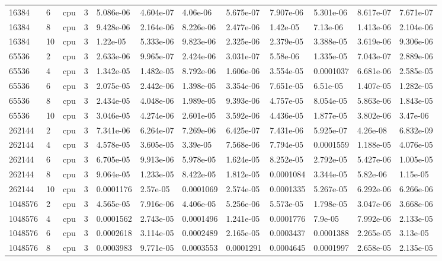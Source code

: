 \begin{tabular}{llllllllllll}
16384 & 6 & cpu & 3 & 5.086e-06 & 4.604e-07 & 4.06e-06 & 5.675e-07 & 7.907e-06 & 5.301e-06 & 8.617e-07 & 7.671e-07 \\
16384 & 8 & cpu & 3 & 9.428e-06 & 2.164e-06 & 8.226e-06 & 2.477e-06 & 1.42e-05 & 7.13e-06 & 1.413e-06 & 2.104e-06 \\
16384 & 10 & cpu & 3 & 1.22e-05 & 5.333e-06 & 9.823e-06 & 2.325e-06 & 2.379e-05 & 3.388e-05 & 3.619e-06 & 9.306e-06 \\
65536 & 2 & cpu & 3 & 2.633e-06 & 9.965e-07 & 2.424e-06 & 3.031e-07 & 5.58e-06 & 1.335e-05 & 7.043e-07 & 2.889e-06 \\
65536 & 4 & cpu & 3 & 1.342e-05 & 1.482e-05 & 8.792e-06 & 1.606e-06 & 3.554e-05 & 0.0001037 & 6.681e-06 & 2.585e-05 \\
65536 & 6 & cpu & 3 & 2.075e-05 & 2.442e-06 & 1.398e-05 & 3.354e-06 & 7.651e-05 & 6.51e-05 & 1.407e-05 & 1.282e-05 \\
65536 & 8 & cpu & 3 & 2.434e-05 & 4.048e-06 & 1.989e-05 & 9.393e-06 & 4.757e-05 & 8.054e-05 & 5.863e-06 & 1.843e-05 \\
65536 & 10 & cpu & 3 & 3.046e-05 & 4.274e-06 & 2.601e-05 & 3.592e-06 & 4.436e-05 & 1.877e-05 & 3.802e-06 & 3.47e-06 \\
262144 & 2 & cpu & 3 & 7.341e-06 & 6.264e-07 & 7.269e-06 & 6.425e-07 & 7.431e-06 & 5.925e-07 & 4.26e-08 & 6.832e-09 \\
262144 & 4 & cpu & 3 & 4.578e-05 & 3.605e-05 & 3.39e-05 & 7.568e-06 & 7.794e-05 & 0.0001559 & 1.188e-05 & 4.076e-05 \\
262144 & 6 & cpu & 3 & 6.705e-05 & 9.913e-06 & 5.978e-05 & 1.624e-05 & 8.252e-05 & 2.792e-05 & 5.427e-06 & 1.005e-05 \\
262144 & 8 & cpu & 3 & 9.064e-05 & 1.233e-05 & 8.422e-05 & 1.812e-05 & 0.0001084 & 3.344e-05 & 5.82e-06 & 1.15e-05 \\
262144 & 10 & cpu & 3 & 0.0001176 & 2.57e-05 & 0.0001069 & 2.574e-05 & 0.0001335 & 5.267e-05 & 6.292e-06 & 6.266e-06 \\
1048576 & 2 & cpu & 3 & 4.565e-05 & 7.916e-06 & 4.406e-05 & 5.256e-06 & 5.573e-05 & 1.798e-05 & 3.047e-06 & 3.668e-06 \\
1048576 & 4 & cpu & 3 & 0.0001562 & 2.743e-05 & 0.0001496 & 1.241e-05 & 0.0001776 & 7.9e-05 & 7.992e-06 & 2.133e-05 \\
1048576 & 6 & cpu & 3 & 0.0002618 & 3.114e-05 & 0.0002489 & 2.165e-05 & 0.0003437 & 0.0001388 & 2.265e-05 & 3.13e-05 \\
1048576 & 8 & cpu & 3 & 0.0003983 & 9.771e-05 & 0.0003553 & 0.0001291 & 0.0004645 & 0.0001997 & 2.658e-05 & 2.135e-05 \\

\end{tabular}

